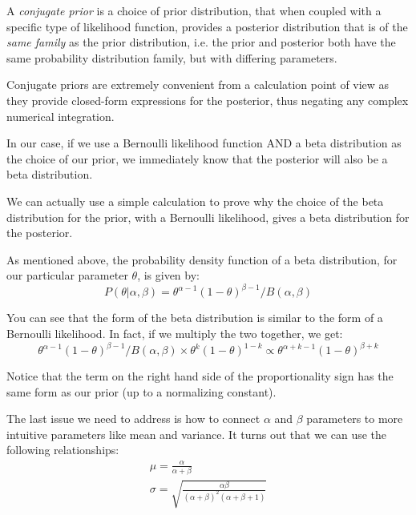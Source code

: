 A \emph{conjugate prior} is a choice of prior distribution, that when coupled with a specific type of likelihood function, provides a posterior distribution that is of the \emph{same family} as the prior distribution, i.e. the prior and posterior both have the same probability distribution family, but with differing parameters.

Conjugate priors are extremely convenient from a calculation point of view as they provide closed-form expressions for the posterior, thus negating any complex numerical integration.

In our case, if we use a Bernoulli likelihood function AND a beta distribution as the choice of our prior, we immediately know that the posterior will also be a beta distribution.


We can actually use a simple calculation to prove why the choice of the beta distribution for the prior, with a Bernoulli likelihood, gives a beta distribution for the posterior.

As mentioned above, the probability density function of a beta distribution, for our particular parameter $\theta$, is given by:
\begin{equation}
  P(\theta|\alpha,\beta)=\theta^{\alpha -1}(1-\theta)^{\beta-1}/B(\alpha,\beta)
\end{equation}

You can see that the form of the beta distribution is similar to the form of a Bernoulli likelihood. In fact, if we multiply the two together, we get:
\begin{equation}
  \theta^{\alpha -1}(1-\theta)^{\beta-1}/B(\alpha,\beta)\times \theta^k(1-\theta)^{1-k} \propto \theta^{\alpha+k-1}(1-\theta)^{\beta+k}
\end{equation}

Notice that the term on the right hand side of the proportionality sign has the same form as our prior (up to a normalizing constant).

The last issue we need to address is how to connect $\alpha$ and $\beta$ parameters to more intuitive parameters like mean and variance. It turns out that we can use the following relationships:
\begin{equation}
  \begin{gathered}
    \mu = \frac{\alpha}{\alpha+\beta} \\
    \sigma = \sqrt{\frac{\alpha\beta}{(\alpha + \beta)^2(\alpha + \beta + 1)}}
  \end{gathered}
\end{equation}

